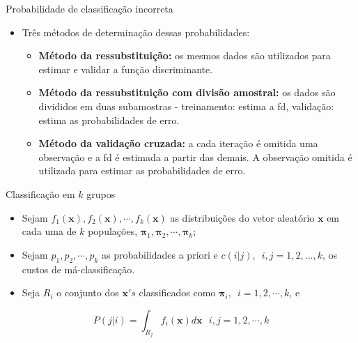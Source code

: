 \documentclass[
  ignorenonframetext,
  aspectratio=169,
]{beamer}
\providecommand{\tightlist}{%
  \setlength{\itemsep}{0pt}\setlength{\parskip}{0pt}}
\begin{document}
\begin{frame}{Probabilidade de classificação incorreta}
\label{probabilidade-de-classificauxe7uxe3o-incorreta-3}
\begin{itemize}
\tightlist
\item
  Três métodos de determinação dessas probabilidades:

  \begin{itemize}
  \tightlist
  \item
    \textbf{Método da ressubstituição:} os mesmos dados são utilizados
    para estimar e validar a função discriminante.
  \item
    \textbf{Método da ressubstituição com divisão amostral:} os dados
    são divididos em duas subamostras - treinamento: estima a fd,
    validação: estima as probabilidades de erro.
  \item
    \textbf{Método da validação cruzada:} a cada iteração é omitida uma
    observação e a fd é estimada a partir das demais. A observação
    omitida é utilizada para estimar as probabilidades de erro.
  \end{itemize}
\end{itemize}
\end{frame}

\begin{frame}{Classificação em \(k\) grupos}
\label{classificauxe7uxe3o-em-k-grupos}
\begin{itemize}
\tightlist
\item
  Sejam
  \(f_1(\boldsymbol{x}), f_2(\boldsymbol{x}), \cdots, f_k(\boldsymbol{x})\)
  as distribuições do vetor aleatório \(\boldsymbol{x}\) em cada uma de
  \(k\) populações,
  \(\boldsymbol{\pi}_1, \boldsymbol{\pi}_2, \cdots, \boldsymbol{\pi}_k\);
\end{itemize}

\pause

\begin{itemize}
\tightlist
\item
  Sejam \(p_1, p_2, \cdots, p_k\) as probabilidades a priori e
  \(c(i|j),\,\,\, i, j = 1, 2, ..., k\), os custos de má-classificação.
\end{itemize}

\pause

\begin{itemize}
\tightlist
\item
  Seja \(R_i\) o conjunto dos \(\boldsymbol{x}'s\) classificados como
  \(\boldsymbol{\pi}_i, \,\,\, i = 1, 2, \cdots, k\), e
\end{itemize}

\[P(j|i) = \displaystyle{\int_{R_j} f_i(\boldsymbol{x}) d\boldsymbol{x}} \,\,\,\, i,j = 1,2, \cdots, k\]
\end{frame}
\end{document}
